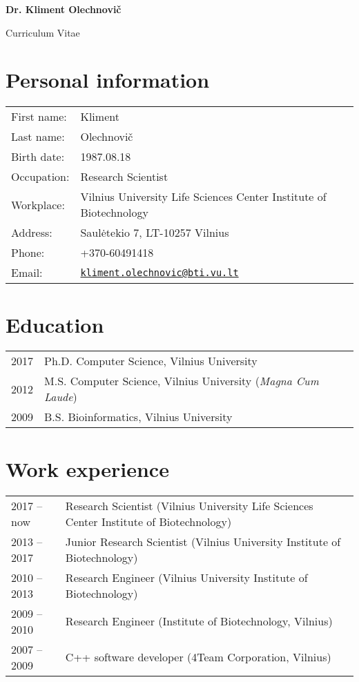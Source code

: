 \documentclass{article}
\def\name{Dr. Kliment Olechnovi\v{c}}
\begin{document}
\begin{center}
{\huge \bf \name}
\end{center}

\begin{center}
{\Large Curriculum Vitae}
\end{center}


\section*{Personal information}
\begin{tabular}{p{}p{}}
First name:          & Kliment\\
Last name:           & Olechnovi\v{c}\\
Birth date:          & 1987.08.18 \\
Occupation:          & Research Scientist \\
Workplace:           & Vilnius University Life Sciences Center Institute of Biotechnology \\
Address:             & Saul\.{e}tekio 7, LT-10257 Vilnius \\
Phone:               & +370-60491418 \\
Email:               & \href{mailto:kliment.olechnovic@bti.vu.lt}{\tt kliment.olechnovic@bti.vu.lt} \\
\end{tabular}


\section*{Education}
\begin{tabular}{p{}p{}}
2017 & Ph.D. Computer Science, Vilnius University \\
2012 & M.S.  Computer Science, Vilnius University (\emph{Magna Cum Laude}) \\
2009 & B.S.  Bioinformatics, Vilnius University
\end{tabular}


\section*{Work experience}
\begin{tabular}{p{}p{}}
2017 -- now  & Research Scientist (Vilnius University Life Sciences Center Institute of Biotechnology)\\
2013 -- 2017 & Junior Research Scientist (Vilnius University Institute of Biotechnology) \\
2010 -- 2013 & Research Engineer (Vilnius University Institute of Biotechnology) \\
2009 -- 2010 & Research Engineer (Institute of Biotechnology, Vilnius) \\
2007 -- 2009 & C++ software developer (4Team Corporation, Vilnius)
\end{tabular}
\end{document}
